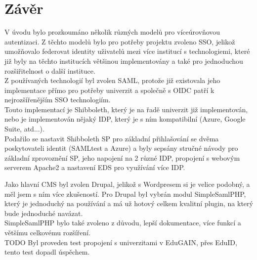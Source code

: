         


\chapter{Závěr}


V úvodu bylo prozkoumáno několik různých modelů pro víceúrovňovou autentizaci. Z těchto modelů bylo pro potřeby projektu zvoleno SSO, jelikož umožňovalo federovat identity uživatelů mezi více institucí s technologiemi, které již byly na těchto institucích většinou implementovány a také pro jednoduchou rozšiřitelnost o další instituce.
\\
Z používaných technologií byl zvolen SAML, protože již existovala jeho implementace přímo pro potřeby univerzit a společně s OIDC patří k nejrozšířenějším SSO technologiím. \\
Touto implementací je Shibboleth, který je na řadě univerzit již implementován, nebo je implementován nějaký IDP, který je s ním kompatibilní (Azure, Google Suite, atd...).\\
Podařilo se nastavit Shibboleth SP pro základní přihlašování se dvěma poskytovateli identit (SAMLtest a Azure) a byly sepsány stručné návody pro základní zprovoznění SP, jeho napojení na 2 různé IDP, propojení s webovým serverem Apache2 a nastavení EDS pro využívání více IDP.

Jako hlavní CMS byl zvolen Drupal, jelikož s Wordpresem si je velice podobný, a měl jsem s ním více zkušeností. Pro Drupal byl vybrán modul SimpleSamlPHP, který je jednoduchý na používání a má už hotový celkem kvalitní plugin, na který bude jednoduché navázat. \\
SimpleSamlPHP bylo také zvoleno z důvodu, lepší dokumentace, více funkcí a většímu celkovému rozšíření. 
\\
TODO Byl proveden test propojení s univerzitami v EduGAIN, přes EduID, tento test dopadl úspěchem. 


\label{zaver}







